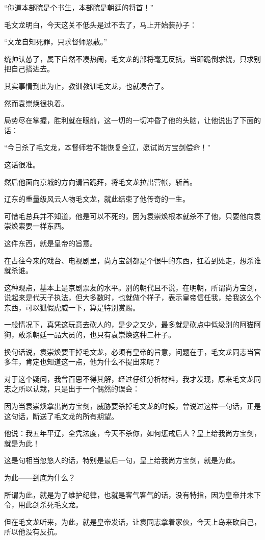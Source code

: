 \begin{multicols}{\theparacolNo}
“你道本部院是个书生，本部院是朝廷的将首！”

毛文龙明白，今天这关不低头是过不去了，马上开始装孙子：

“文龙自知死罪，只求督师恩赦。”

统帅认怂了，属下自然不凑热闹，毛文龙的部将毫无反抗，当即跪倒求饶，只求别把自己搭进去。

其实事情到此为止，教训教训毛文龙，也就凑合了。

然而袁崇焕很执着。

局势尽在掌握，胜利就在眼前，这一切的一切冲昏了他的头脑，让他说出了下面的话：

“今日杀了毛文龙，本督师若不能恢复全辽，愿试尚方宝剑偿命！”

这话很准。

然后他面向京城的方向请旨跪拜，将毛文龙拉出营帐，斩首。

辽东的重量级风云人物毛文龙，就此结束了他传奇的一生。

可惜毛总兵并不知道，他是可以不死的，因为袁崇焕根本就杀不了他，只要他向袁崇焕索要一样东西。

这件东西，就是皇帝的旨意。

在古往今来的戏台、电视剧里，尚方宝剑都是个很牛的东西，扛着到处走，想杀谁就杀谁。

这种观点，基本上是京剧票友的水平。别的朝代且不说，在明朝，所谓尚方宝剑，说起来是代天子执法，但大多数时，也就做个样子，表示皇帝信任我，给我这么个东西，可以狐假虎威一下，算是特别赏赐。

一般情况下，真凭这玩意去砍人的，是少之又少，最多就是砍点中低级别的阿猫阿狗，敢杀朝廷一品大员的，也只有袁崇焕这种二杆子。

换句话说，袁崇焕要干掉毛文龙，必须有皇帝的旨意，问题在于，毛文龙同志当官多年，肯定也知道这一点，他为什么不提出来呢？

对于这个疑问，我曾百思不得其解，经过仔细分析材料，我才发现，原来毛文龙同志之所以认栽，只是出于一个偶然的误会：

因为当袁崇焕拿出尚方宝剑，威胁要杀掉毛文龙的时候，曾说过这样一句话，正是这句话，断送了毛文龙的所有期望。

他说：我五年平辽，全凭法度，今天不杀你，如何惩戒后人？皇上给我尚方宝剑，就是为此！

这是句相当忽悠人的话，特别是最后一句，皇上给我尚方宝剑，就是为此。

为此——到底为什么？

所谓为此，就是为了维护纪律，也就是客气客气的话，没有特指，因为皇帝并未下令，用此剑杀死毛文龙。

但在毛文龙听来，为此，就是皇帝发话，让袁同志拿着家伙，今天上岛来砍自己，所以他没有反抗。


\end{multicols}
